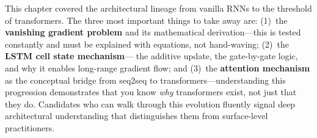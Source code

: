 \begin{interviewq}
\end{interviewq}

\bigskip
\begin{keyinsight}
This chapter covered the architectural lineage from vanilla RNNs to the
threshold of transformers.  The three most important things to take away
are: (1)~the \textbf{vanishing gradient problem} and its mathematical
derivation---this is tested constantly and must be explained with
equations, not hand-waving; (2)~the \textbf{LSTM cell state mechanism}---
the additive update, the gate-by-gate logic, and why it enables
long-range gradient flow; and (3)~the \textbf{attention mechanism} as the
conceptual bridge from seq2seq to transformers---understanding this
progression demonstrates that you know \emph{why} transformers exist, not
just that they do.  Candidates who can walk through this evolution
fluently signal deep architectural understanding that distinguishes them
from surface-level practitioners.
\end{keyinsight}
